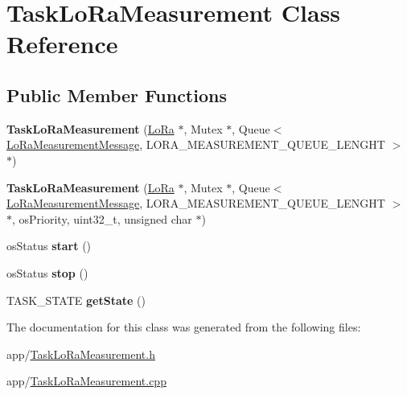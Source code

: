 \hypertarget{class_task_lo_ra_measurement}{}\section{Task\+Lo\+Ra\+Measurement Class Reference}
\label{class_task_lo_ra_measurement}
\subsection*{Public Member Functions}
\begin{DoxyCompactItemize}
\item 
\hypertarget{class_task_lo_ra_measurement_a4804d2c7c191263ed5c2326053f9af80}{}{\bfseries Task\+Lo\+Ra\+Measurement} (\hyperlink{class_lo_ra}{Lo\+Ra} $\ast$, Mutex $\ast$, Queue$<$ \hyperlink{class_lo_ra_measurement_message}{Lo\+Ra\+Measurement\+Message}, L\+O\+R\+A\+\_\+\+M\+E\+A\+S\+U\+R\+E\+M\+E\+N\+T\+\_\+\+Q\+U\+E\+U\+E\+\_\+\+L\+E\+N\+G\+H\+T $>$ $\ast$)\label{class_task_lo_ra_measurement_a4804d2c7c191263ed5c2326053f9af80}

\item 
\hypertarget{class_task_lo_ra_measurement_a854fd5902ff4b10789679b99e2295636}{}{\bfseries Task\+Lo\+Ra\+Measurement} (\hyperlink{class_lo_ra}{Lo\+Ra} $\ast$, Mutex $\ast$, Queue$<$ \hyperlink{class_lo_ra_measurement_message}{Lo\+Ra\+Measurement\+Message}, L\+O\+R\+A\+\_\+\+M\+E\+A\+S\+U\+R\+E\+M\+E\+N\+T\+\_\+\+Q\+U\+E\+U\+E\+\_\+\+L\+E\+N\+G\+H\+T $>$ $\ast$, os\+Priority, uint32\+\_\+t, unsigned char $\ast$)\label{class_task_lo_ra_measurement_a854fd5902ff4b10789679b99e2295636}

\item 
\hypertarget{class_task_lo_ra_measurement_ac331608e72b047b38be7ca337f8f29c3}{}os\+Status {\bfseries start} ()\label{class_task_lo_ra_measurement_ac331608e72b047b38be7ca337f8f29c3}

\item 
\hypertarget{class_task_lo_ra_measurement_af0a05ec4fab757f41dce844f7dfdc9e1}{}os\+Status {\bfseries stop} ()\label{class_task_lo_ra_measurement_af0a05ec4fab757f41dce844f7dfdc9e1}

\item 
\hypertarget{class_task_lo_ra_measurement_ac93275c5eb42385214f63442c83066f0}{}T\+A\+S\+K\+\_\+\+S\+T\+A\+T\+E {\bfseries get\+State} ()\label{class_task_lo_ra_measurement_ac93275c5eb42385214f63442c83066f0}

\end{DoxyCompactItemize}


The documentation for this class was generated from the following files\+:\begin{DoxyCompactItemize}
\item 
app/\hyperlink{_task_lo_ra_measurement_8h}{Task\+Lo\+Ra\+Measurement.\+h}\item 
app/\hyperlink{_task_lo_ra_measurement_8cpp}{Task\+Lo\+Ra\+Measurement.\+cpp}\end{DoxyCompactItemize}
